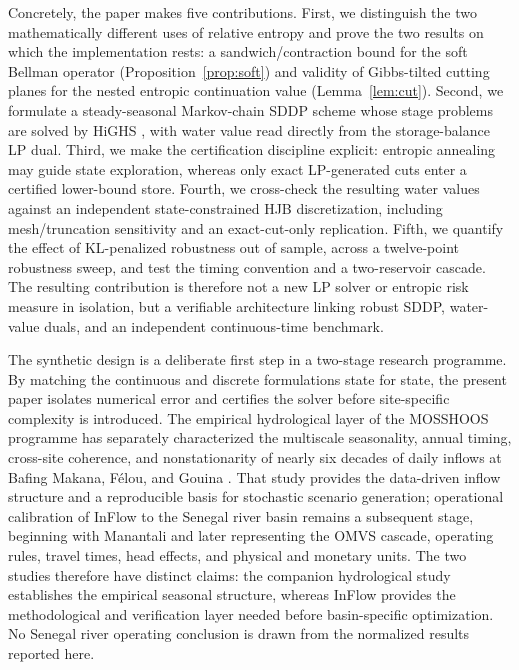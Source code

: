 \documentclass[pdflatex,sn-mathphys-num]{sn-jnl}
\theoremstyle{thmstyleone}
\theoremstyle{thmstyletwo}
\theoremstyle{thmstylethree}
\begin{document}
Concretely, the paper makes five contributions. First, we distinguish the
two mathematically different uses of relative entropy and prove the two
results on which the implementation rests: a sandwich/contraction bound for
the soft Bellman operator (Proposition~\ref{prop:soft}) and validity of
Gibbs-tilted cutting planes for the nested entropic continuation value
(Lemma~\ref{lem:cut}). Second, we formulate a steady-seasonal Markov-chain
SDDP scheme \citep{shapiro2020} whose stage problems are solved by HiGHS
\citep{huangfu2018}, with water value read directly from the storage-balance
LP dual. Third, we make the certification discipline explicit: entropic
annealing may guide state exploration, whereas only exact LP-generated cuts
enter a certified lower-bound store. Fourth, we cross-check the resulting
water values against an independent state-constrained HJB discretization,
including mesh/truncation sensitivity and an exact-cut-only replication.
Fifth, we quantify the effect of KL-penalized robustness out of sample,
across a twelve-point robustness sweep, and test the timing convention and a
two-reservoir cascade. The resulting contribution is therefore not a new LP
solver or entropic risk measure in isolation, but a verifiable architecture
linking robust SDDP, water-value duals, and an independent continuous-time
benchmark.

The synthetic design is a deliberate first step in a two-stage research
programme. By matching the continuous and discrete formulations state for
state, the present paper isolates numerical error and certifies the solver
before site-specific complexity is introduced. The empirical hydrological
layer of the MOSSHOOS programme has separately characterized the multiscale
seasonality, annual timing, cross-site coherence, and nonstationarity of
nearly six decades of daily inflows at Bafing Makana, F\'elou, and Gouina
\citep{affognon2026wavelet}. That study provides the data-driven inflow
structure and a reproducible basis for stochastic scenario generation;
operational calibration of InFlow to the Senegal river basin remains a
subsequent stage, beginning with Manantali and later representing the OMVS
cascade, operating rules, travel times, head effects, and physical and
monetary units. The two studies therefore have distinct claims: the companion
hydrological study establishes the empirical seasonal structure, whereas
InFlow provides the methodological and verification layer needed before
basin-specific optimization. No Senegal river operating conclusion is drawn
from the normalized results reported here.
\end{document}
